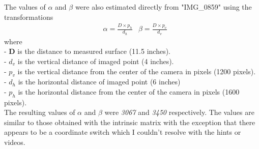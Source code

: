 \documentclass[12pt]{report}
\begin{document}
\begin{enumerate}
\begin{enumerate}
    The values of $\alpha$ and $\beta$ were also estimated directly from "IMG\_0859" using the transformations
    \begin{align*}
    & \alpha = \frac{D \times p_h}{d_h}  &  \beta = \frac{D \times p_v}{d_v}
    \end{align*}
    where \\
    - \textbf{D} is the distance to measured surface (11.5 inches). \\ 
    - $d_v$ is the vertical distance of imaged point (4 inches). \\ 
    - $p_v$ is the vertical distance from the center of the camera in pixels (1200 pixels). \\
    - $d_h$ is the horizontal distance of imaged point (6 inches) \\ 
    - $p_h$ is the horizontal distance from the center of the camera in pixels (1600 pixels). \\

    The resulting values of $\alpha$ and $\beta$ were \emph{3067} and \emph{3450} respectively. The values are similar to those obtained with the intrinsic matrix 
    with the exception that there appears to be a coordinate switch which I couldn't resolve with the hints or videos.

    \end{enumerate}
    









\end{enumerate}
\end{document}
